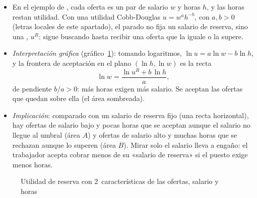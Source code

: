 \documentclass[11pt]{article}
\begin{document}
\begin{itemize}
\begin{itemize}
    \begin{itemize}
    \item En el ejemplo de , cada oferta es un par de salario $w$ y horas $h$, y las horas restan utilidad. Con una utilidad Cobb-Douglas $u=w^{a}h^{-b}$, con $a,b>0$ (letras locales de este apartado), el parado no fija un salario de reserva, sino una , $u^R$: sigue buscando hasta recibir una oferta que la iguale o la supere.
    \item \emph{Interpretación gráfica} (gráfico~\ref{fig:blau}): tomando logaritmos, $\ln u=a\ln w-b\ln h$, y la frontera de aceptación en el plano $(\ln h,\ln w)$ es la recta
      \begin{equation*}
      \ln w=\frac{\ln u^R+b\,\ln h}{a},
      \end{equation*}
      de pendiente $b/a>0$: más horas exigen más salario. Se aceptan las ofertas que quedan sobre ella (el área sombreada).
    \item \emph{Implicación}: comparado con un salario de reserva fijo (una recta horizontal), hay ofertas de salario bajo y pocas horas que se aceptan aunque el salario no llegue al umbral (área $A$) y ofertas de salario alto y muchas horas que se rechazan aunque lo superen (área $B$). Mirar solo el salario lleva a engaño: el trabajador acepta cobrar menos de su «salario de reserva» si el puesto exige menos horas.
    \end{itemize}
  \end{itemize}
\end{itemize}

\begin{figure}[H]
\centering
\caption{Utilidad de reserva con 2~características de las ofertas, salario y horas}\label{fig:blau}
\end{figure}
\end{document}
